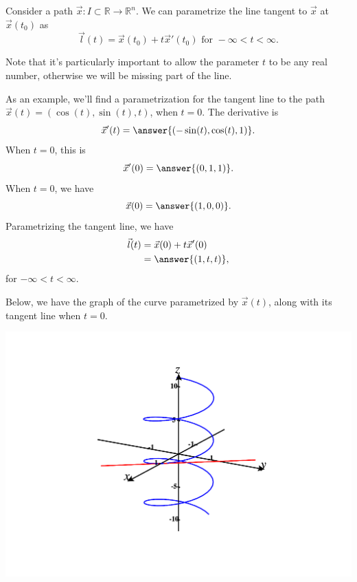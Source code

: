 \documentclass{ximera}
\begin{document}
\begin{proposition}
Consider a path $\vec{x}:I\subset\mathbb{R}\rightarrow\mathbb{R}^n$. We can parametrize the line tangent to $\vec{x}$ at $\vec{x}(t_0)$ as
\[
\vec{l}(t) = \vec{x}(t_0) + t\vec{x}'(t_0) \textrm{ for } -\infty < t < \infty.
\]
\end{proposition}

Note that it's particularly important to allow the parameter $t$ to be any real number, otherwise we will be missing part of the line.

\begin{example}
As an example, we'll find a parametrization for the tangent line to the path $\vec{x}(t)=(\cos(t),\sin(t),t)$, when $t=0$. The derivative is
\[
\vec{x}'(t) = \answer{(-\sin(t),\cos(t),1)}.
\]
When $t=0$, this is
\[
\vec{x}'(0) = \answer{(0,1,1)}.
\]
When $t=0$, we have
\[
\vec{x}(0) = \answer{(1,0,0)}.
\]
Parametrizing the tangent line, we have
\begin{align*}
\vec{l}(t) &= \vec{x}(0) + t\vec{x}'(0)\\
&= \answer{(1,t,t)},
\end{align*}
for $-\infty < t < \infty$.

Below, we have the graph of the curve parametrized by $\vec{x}(t)$, along with its tangent line when $t=0$.

\begin{image}
\includegraphics[width=\textwidth]{CalcPlot3D-tangent_line}
\end{image}
\end{example}
\end{document}
